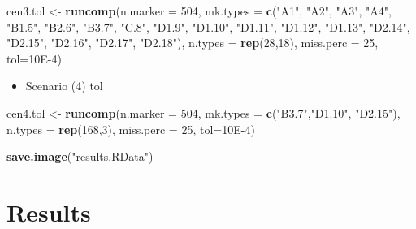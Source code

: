 \documentclass[]{article}
\newenvironment{Shaded}{\begin{snugshade}}{\end{snugshade}}
\newcommand{\DataTypeTok}[1]{\textcolor[rgb]{0.13,0.29,0.53}{#1}}
\newcommand{\DecValTok}[1]{\textcolor[rgb]{0.00,0.00,0.81}{#1}}
\newcommand{\FloatTok}[1]{\textcolor[rgb]{0.00,0.00,0.81}{#1}}
\newcommand{\KeywordTok}[1]{\textcolor[rgb]{0.13,0.29,0.53}{\textbf{#1}}}
\newcommand{\NormalTok}[1]{#1}
\newcommand{\StringTok}[1]{\textcolor[rgb]{0.31,0.60,0.02}{#1}}
\providecommand{\tightlist}{%
  \setlength{\itemsep}{0pt}\setlength{\parskip}{0pt}}
\begin{document}
\begin{Shaded}
\begin{Highlighting}[]
\NormalTok{cen3.tol <-}\StringTok{ }\KeywordTok{runcomp}\NormalTok{(}\DataTypeTok{n.marker =} \DecValTok{504}\NormalTok{, }
                    \DataTypeTok{mk.types =} \KeywordTok{c}\NormalTok{(}\StringTok{"A1"}\NormalTok{, }\StringTok{"A2"}\NormalTok{, }\StringTok{"A3"}\NormalTok{, }\StringTok{"A4"}\NormalTok{, }\StringTok{"B1.5"}\NormalTok{, }\StringTok{"B2.6"}\NormalTok{, }\StringTok{"B3.7"}\NormalTok{,}
                                 \StringTok{"C.8"}\NormalTok{, }\StringTok{"D1.9"}\NormalTok{, }\StringTok{"D1.10"}\NormalTok{, }\StringTok{"D1.11"}\NormalTok{, }\StringTok{"D1.12"}\NormalTok{, }\StringTok{"D1.13"}\NormalTok{,}
                                 \StringTok{"D2.14"}\NormalTok{, }\StringTok{"D2.15"}\NormalTok{, }\StringTok{"D2.16"}\NormalTok{, }\StringTok{"D2.17"}\NormalTok{, }\StringTok{"D2.18"}\NormalTok{),}
                    \DataTypeTok{n.types =} \KeywordTok{rep}\NormalTok{(}\DecValTok{28}\NormalTok{,}\DecValTok{18}\NormalTok{),}
                    \DataTypeTok{miss.perc =} \DecValTok{25}\NormalTok{, }\DataTypeTok{tol=}\FloatTok{10E-4}\NormalTok{)}
\end{Highlighting}
\end{Shaded}

\begin{itemize}
\tightlist
\item
  Scenario (4) tol
\end{itemize}

\begin{Shaded}
\begin{Highlighting}[]
\NormalTok{cen4.tol <-}\StringTok{ }\KeywordTok{runcomp}\NormalTok{(}\DataTypeTok{n.marker =} \DecValTok{504}\NormalTok{, }
                    \DataTypeTok{mk.types =} \KeywordTok{c}\NormalTok{(}\StringTok{"B3.7"}\NormalTok{,}\StringTok{"D1.10"}\NormalTok{, }\StringTok{"D2.15"}\NormalTok{),}
                    \DataTypeTok{n.types =} \KeywordTok{rep}\NormalTok{(}\DecValTok{168}\NormalTok{,}\DecValTok{3}\NormalTok{),}
                    \DataTypeTok{miss.perc =} \DecValTok{25}\NormalTok{, }\DataTypeTok{tol=}\FloatTok{10E-4}\NormalTok{)}

\KeywordTok{save.image}\NormalTok{(}\StringTok{"results.RData"}\NormalTok{)}
\end{Highlighting}
\end{Shaded}

\hypertarget{results}{%
\section{Results}\label{results}}
\end{document}
